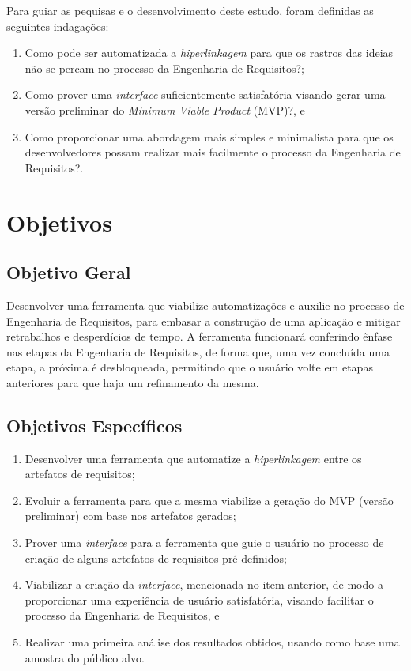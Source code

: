 \label{ref:questao_pesquisa}

Para guiar as pequisas e o desenvolvimento deste estudo, foram definidas as seguintes indagações:

\begin{enumerate}
    \item Como pode ser automatizada a \textit{hiperlinkagem} para que os rastros das ideias não se percam no processo da Engenharia de Requisitos?;
    \item Como prover uma \textit{interface} suficientemente satisfatória visando gerar uma versão preliminar do \textit{Minimum Viable Product} (MVP)?, e
    \item Como proporcionar uma abordagem mais simples e minimalista para que os desenvolvedores possam realizar mais facilmente o processo da Engenharia de Requisitos?.
\end{enumerate}

\section{Objetivos}

\label{ref:objetivos}

\subsection{Objetivo Geral}

Desenvolver uma ferramenta que viabilize automatizações e auxilie no processo de Engenharia de Requisitos, para embasar a construção de uma aplicação e mitigar retrabalhos e desperdícios de tempo. A ferramenta funcionará conferindo ênfase nas etapas da Engenharia de Requisitos, de forma que, uma vez concluída uma etapa, a próxima é desbloqueada, permitindo que o usuário volte em etapas anteriores para que haja um refinamento da mesma.

\subsection{Objetivos Específicos}

\begin{enumerate}
    \item \label{oe_hiperlinkagem} Desenvolver uma ferramenta que automatize a \textit{hiperlinkagem} entre os artefatos de requisitos;
    \item \label{oe_mvp} Evoluir a ferramenta para que a mesma viabilize a geração do MVP (versão preliminar) com base nos artefatos gerados;
    \item \label{oe_guiar_usuario} Prover uma \textit{interface} para a ferramenta que guie o usuário no processo de criação de alguns artefatos de requisitos pré-definidos;
    \item \label{oe_ux_facilitada} Viabilizar a criação da \textit{interface}, mencionada no item anterior, de modo a proporcionar uma experiência de usuário satisfatória, visando facilitar o processo da Engenharia de Requisitos, e
    \item \label{oe_resultados} Realizar uma primeira análise dos resultados obtidos, usando como base uma amostra do público alvo.
\end{enumerate}

